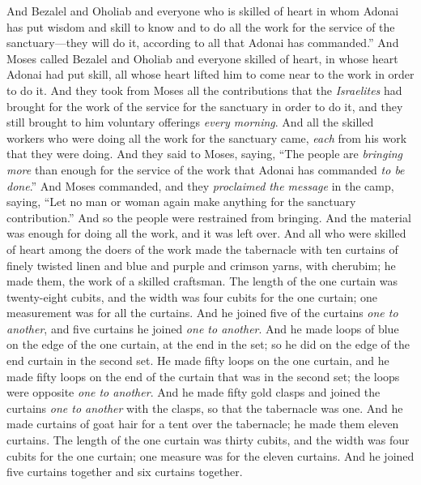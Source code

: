 \begin{biblechapter} %
\verse And Bezalel and Oholiab and everyone who is skilled of heart in whom Adonai has put wisdom and skill to know and to do all the work for the service of the sanctuary—they will do it, according to all that Adonai has commanded.”
 And Moses called Bezalel and Oholiab and everyone skilled of heart, in whose heart Adonai had put skill, all whose heart lifted him to come near to the work in order to do it.
\verse And they took from Moses all the contributions that the \textit{Israelites} had brought for the work of the service for the sanctuary in order to do it, and they still brought to him voluntary offerings \textit{every morning}.
\verse And all the skilled workers who were doing all the work for the sanctuary came, \textit{each} from his work that they were doing.
\verse And they said to Moses, saying, “The people are \textit{bringing more} than enough for the service of the work that Adonai has commanded \textit{to be done}.”
\verse And Moses commanded, and they \textit{proclaimed the message} in the camp, saying, “Let no man or woman again make anything for the sanctuary contribution.” And so the people were restrained from bringing.
\verse And the material was enough for doing all the work, and it was left over.
\verse And all who were skilled of heart among the doers of the work made the tabernacle with ten curtains of finely twisted linen and blue and purple and crimson yarns, with cherubim; he made them, the work of a skilled craftsman.
\verse The length of the one curtain was twenty-eight cubits, and the width was four cubits for the one curtain; one measurement was for all the curtains.
\verse And he joined five of the curtains \textit{one to another}, and five curtains he joined \textit{one to another}.
\verse And he made loops of blue on the edge of the one curtain, at the end in the set; so he did on the edge of the end curtain in the second set.
\verse He made fifty loops on the one curtain, and he made fifty loops on the end of the curtain that was in the second set; the loops were opposite \textit{one to another}.
\verse And he made fifty gold clasps and joined the curtains \textit{one to another} with the clasps, so that the tabernacle was one.
\verse And he made curtains of goat hair for a tent over the tabernacle; he made them eleven curtains.
\verse The length of the one curtain was thirty cubits, and the width was four cubits for the one curtain; one measure was for the eleven curtains.
\verse And he joined five curtains together and six curtains together.

\end{biblechapter}
